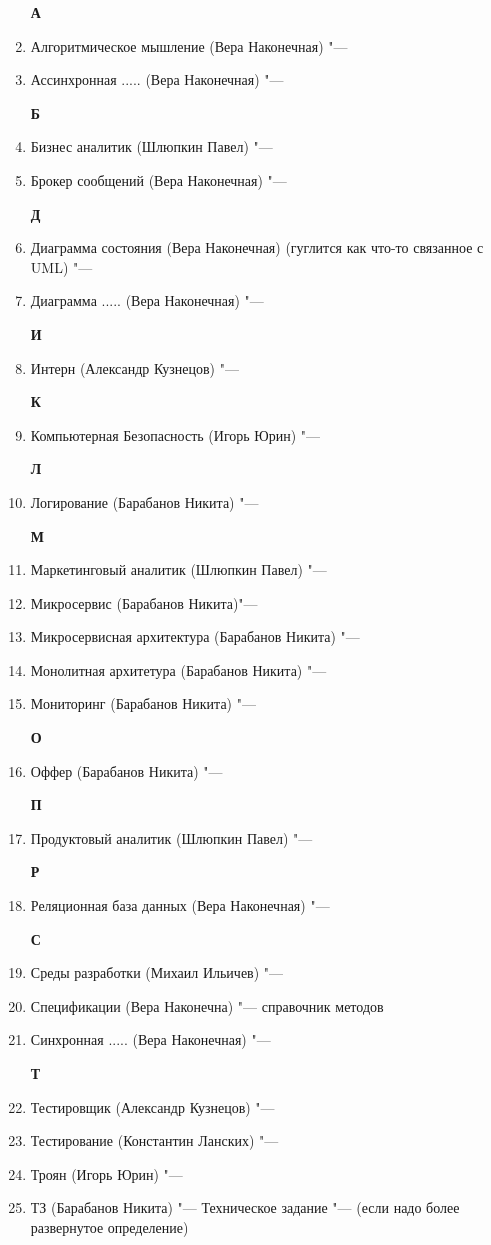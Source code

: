 \documentclass{article}
\begin{document}
\begin{enumerate}
    \textbf{А}
    \item {Алгоритмическое мышление (Вера Наконечная) "---}
    \item {Ассинхронная ..... (Вера Наконечная) "---}

    
    \textbf{Б}
    \item {Бизнес аналитик (Шлюпкин Павел) "---}
    \item {Брокер сообщений (Вера Наконечная) "---}
    

    \textbf{Д}
    \item {Диаграмма состояния (Вера Наконечная) (гуглится как что-то связанное с UML) "--- }
    \item {Диаграмма ..... (Вера Наконечная) "--- }

    \textbf{И}
    \item {Интерн (Александр Кузнецов) "--- }

    \textbf{К}
    \item {Компьютерная Безопасность (Игорь Юрин) "--- }

    \textbf{Л}
    \item {Логирование (Барабанов Никита) "---}

    \textbf{М}
    \item  {Маркетинговый аналитик (Шлюпкин Павел) "--- }
    \item {Микросервис (Барабанов Никита)"---}
    \item {Микросервисная архитектура (Барабанов Никита) "---}
    \item {Монолитная архитетура (Барабанов Никита) "--- }
    \item {Мониторинг (Барабанов Никита) "--- }
    
    \textbf{О}
    \item {Оффер (Барабанов Никита) "---}
    
    \textbf{П}
    \item {Продуктовый аналитик (Шлюпкин Павел) "---}
    
    \textbf{Р}
    \item {Реляционная база данных (Вера Наконечная) "---}

    \textbf{С}
    \item {Среды разработки (Михаил Ильичев) "--- }
    \item {Спецификации (Вера Наконечна) "--- справочник методов}
    \item {Синхронная ..... (Вера Наконечная) "---}
    
    \textbf{Т}
    \item {Тестировщик (Александр Кузнецов) "--- }
    \item {Тестирование (Константин Ланских) "--- }
    \item {Троян (Игорь Юрин) "--- }
    \item {ТЗ (Барабанов Никита) "--- Техническое задание "--- (если надо более развернутое определение)}


\end{enumerate}
\end{document}
